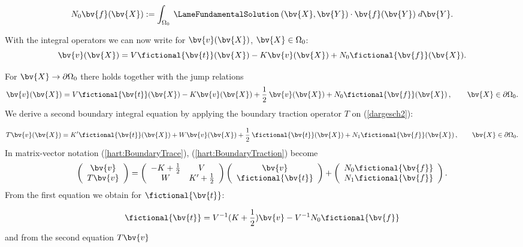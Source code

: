 \begin{equation}
N_{0} \bv{f}(\bv{X}):=\int_{{\Omega_0}}\:\LameFundamentalSolution\:(\bv{X},\bv{Y})\cdot\bv{f}(\bv{Y})\;d \bv{Y}.
\end{equation} 


With the integral operators we can now write for $\bv{v}(\bv{X})$, $\bv{X}\in{\Omega_0}$:
\begin{equation}
\bv{v}(\bv{X})= V\fictional{\bv{t}}(\bv{X})-
K \bv{v}(\bv{X})+N_{0}\fictional{\bv{f}}(\bv{X}).\label{dargesch2} 
\end{equation}  

For  $\bv{X}\rightarrow\partial{\Omega_0}$ there holds together with the jump relations 
\begin{equation}\label{hart:BoundaryTrace}
\bv{v}(\bv{X})= V\fictional{\bv{t}}(\bv{X})-
K \bv{v}(\bv{X})+\frac{1}{2}\:\bv{v}(\bv{X})+N_{0}\fictional{\bv{f}}(\bv{X})\,,\qquad\bv{X}\in\partial{\Omega_0}.
\end{equation}  
We derive a second boundary integral equation by applying the boundary traction operator $T$ on (\ref{dargesch2}):

\begin{equation}\label{hart:BoundaryTraction}
T\bv{v}(\bv{X})= K'\fictional{\bv{t}}(\bv{X})+
W \bv{v}(\bv{X})+\frac{1}{2}\:\fictional{\bv{t}}(\bv{X})+N_{1}\fictional{\bv{f}}(\bv{X})\,,\qquad\bv{X}\in\partial{\Omega_0}.
\end{equation} 
In matrix-vector notation (\ref{hart:BoundaryTrace}), (\ref{hart:BoundaryTraction}) become
\begin{equation*}
\left( \begin{array}{c}
\bv{v}\\
T\bv{v}
\end{array}\right) =
\left(\begin{array}{cc}
-K+\frac{1}{2}&V\\
W&K'+\frac{1}{2}
\end{array}
\right) 
\left(\begin{array}{c}
\bv{v}\\
\fictional{\bv{t}}
\end{array}
\right) +
\left( \begin{array}{c}
N_{0}\fictional{\bv{f}}\\
N_{1}\fictional{\bv{f}}
\end{array}
\right) .
\end{equation*}
From the first equation we obtain for $\fictional{\bv{t}}$:

\begin{equation*}
\fictional{\bv{t}}=V^{-1}(K+\frac{1}{2})\bv{v}-V^{-1}N_{0}\fictional{\bv{f}}
\end{equation*}
and from the second equation $T\bv{v}$

